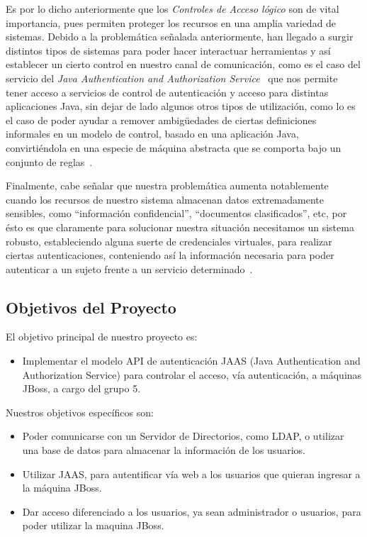 	Es por lo dicho anteriormente que los \emph{Controles de Acceso lógico} son de vital
	importancia, pues permiten proteger los recursos en una amplia variedad de sistemas.
	Debido a la problemática señalada anteriormente, han llegado a surgir distintos tipos
	de sistemas para poder hacer interactuar herramientas y así establecer un cierto control
	en nuestro canal de comunicación, como es el caso del servicio del \emph{Java
	Authentication and Authorization Service}~\cite{paper1} que nos permite tener acceso a
	servicios de control de autenticación y acceso para distintas aplicaciones Java,
	sin dejar de lado algunos otros tipos de utilización,
	como lo es el caso de poder ayudar a remover ambigüedades de ciertas definiciones informales
	en un modelo de control, basado en una aplicación Java, convirtiéndola en una especie
	de máquina abstracta que se comporta bajo un conjunto de reglas~\cite{paper2}.

	Finalmente, cabe señalar que nuestra problemática aumenta notablemente cuando los recursos de
	nuestro sistema almacenan datos extremadamente sensibles, como ``información confidencial'',
	``documentos clasificados'', etc, por ésto es que claramente para solucionar nuestra situación
	necesitamos un sistema robusto, estableciendo alguna suerte de credenciales virtuales,
	para realizar ciertas autenticaciones, conteniendo así la información necesaria para poder
	autenticar a un sujeto frente a un servicio determinado~\cite{paper3}.
	

\subsection{Objetivos del Proyecto}
	El objetivo principal de nuestro proyecto es:

\begin{itemize}
\item Implementar el modelo API de autenticación JAAS (Java Authentication and Authorization Service) para controlar el acceso, vía autenticación, a máquinas JBoss, a cargo del grupo 5. 
\end{itemize}
	Nuestros objetivos específicos son:

\begin{itemize}
\item Poder comunicarse con un Servidor de Directorios, como LDAP, o utilizar una base de datos para almacenar la información de los usuarios.
\item Utilizar JAAS, para autentificar vía  web a los usuarios que quieran ingresar a la máquina JBoss.
\item Dar acceso diferenciado a los usuarios, ya sean administrador o usuarios, para poder utilizar la maquina JBoss.
\end{itemize}

